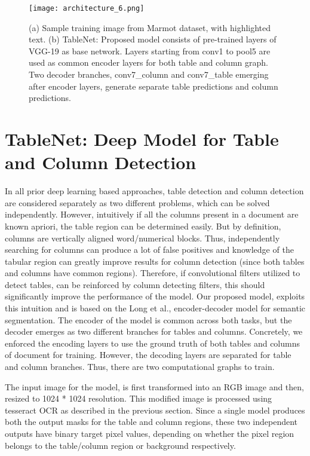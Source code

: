 \documentclass[conference]{IEEEtran}
\begin{document}
\begin{figure*}[h]
\texttt{[image: architecture\_6.png]}
\caption{(a) Sample training image from Marmot dataset, with highlighted text. (b) TableNet: Proposed model consists of pre-trained layers of VGG-19 as base network. Layers starting from conv1 to pool5 are used as common encoder layers for both table and column graph. Two decoder branches, conv7\_column and conv7\_table emerging after encoder layers, generate separate table predictions and column predictions.
}
\label{arch}
\end{figure*}


\section{TableNet: Deep Model for Table and Column Detection}
\label{sec:TableNet}
In all prior deep learning based approaches, table detection and column detection are considered separately as two different problems, which can be solved independently. However, intuitively if all the columns present in a document are known apriori, the table region can be determined easily. But by definition, columns are vertically aligned word/numerical blocks. Thus, independently searching for columns can produce a lot of false positives and knowledge of the tabular region can greatly improve results for column detection (since both tables and columns have common regions). Therefore, if convolutional filters utilized to detect tables, can be reinforced by column detecting filters, this should significantly improve the performance of the model. Our proposed model, exploits this intuition and  is based on the Long et al.\cite{DBLP:journals/corr/LongSD14}, encoder-decoder model for semantic segmentation. The encoder of the model is common across both tasks, but the decoder emerges as two different branches for tables and columns. Concretely, we enforced the encoding layers to use the ground truth of both tables and columns of document for training. However, the decoding layers are separated for table and column branches. Thus, there are two computational graphs to train.

The input image for the model, is first transformed into an RGB image and then, resized to 1024 * 1024 resolution. This modified image is processed using tesseract OCR \cite{smith2007overview} as described in the previous section. Since a single model produces both the output masks for the table and column regions, these two independent outputs have binary target pixel values, depending on whether the pixel region belongs to the table/column region or background respectively.
\end{document}
